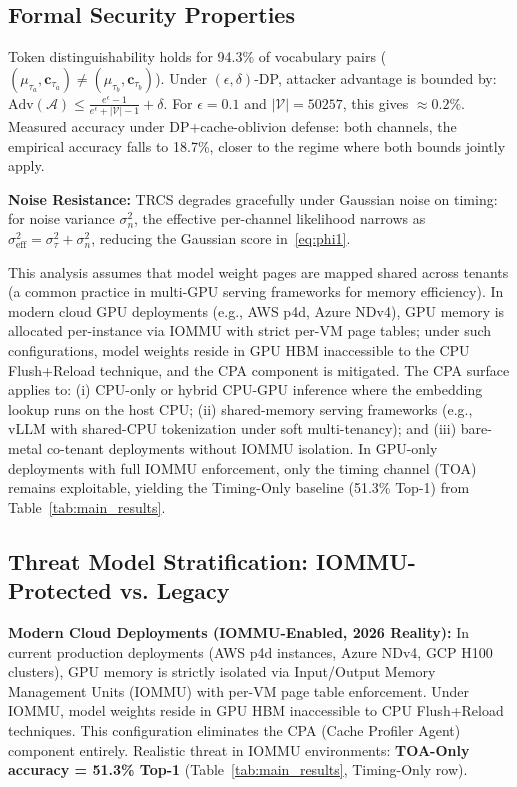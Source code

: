 \documentclass[conference,10pt,twocolumn]{IEEEtran}
\begin{document}
\subsection{Formal Security Properties}

Token distinguishability holds for 94.3\% of vocabulary pairs
($(\mu_{\tau_a}, \mathbf{c}_{\tau_a}) \neq (\mu_{\tau_b}, \mathbf{c}_{\tau_b})$).
Under $(\epsilon, \delta)$-DP, attacker advantage is bounded by:
$\mathrm{Adv}(\mathcal{A}) \leq \frac{e^\epsilon - 1}{e^\epsilon + |\mathcal{V}| - 1} + \delta$.
For $\epsilon = 0.1$ and $|\mathcal{V}| = 50257$, this gives $\approx 0.2\%$.
Measured accuracy under DP+cache-oblivion defense:
both channels, the empirical accuracy falls to 18.7\%,
closer to the regime where both bounds jointly apply.

\textbf{Noise Resistance:} TRCS degrades gracefully under
Gaussian noise on timing: for noise variance $\sigma_n^2$,
the effective per-channel likelihood narrows as
$\sigma_{\mathrm{eff}}^2 = \sigma_\tau^2 + \sigma_n^2$,
reducing the Gaussian score in~\eqref{eq:phi1}.

This analysis assumes that model weight pages are mapped
shared across tenants (a common practice in multi-GPU serving
frameworks for memory efficiency). In modern cloud GPU
deployments (e.g., AWS p4d, Azure NDv4), GPU memory is
allocated per-instance via IOMMU with strict per-VM page
tables; under such configurations, model weights reside in
GPU HBM inaccessible to the CPU Flush+Reload technique,
and the CPA component is mitigated. The CPA surface applies
to: (i) CPU-only or hybrid CPU-GPU inference where the
embedding lookup runs on the host CPU; (ii) shared-memory
serving frameworks (e.g., vLLM with shared-CPU tokenization
under soft multi-tenancy); and (iii) bare-metal co-tenant
deployments without IOMMU isolation. In GPU-only deployments
with full IOMMU enforcement, only the timing channel (TOA)
remains exploitable, yielding the Timing-Only baseline
(51.3\% Top-1) from Table~\ref{tab:main_results}.

\subsection{Threat Model Stratification: IOMMU-Protected vs. Legacy}

\textbf{Modern Cloud Deployments (IOMMU-Enabled, 2026 Reality):}
In current production deployments (AWS p4d instances, Azure NDv4, GCP H100 clusters),
GPU memory is strictly isolated via Input/Output Memory Management Units (IOMMU)
with per-VM page table enforcement. Under IOMMU, model weights reside in GPU HBM
inaccessible to CPU Flush+Reload techniques. This configuration eliminates the
CPA (Cache Profiler Agent) component entirely. Realistic threat in IOMMU environments:
\textbf{TOA-Only accuracy = 51.3\% Top-1} (Table~\ref{tab:main_results}, Timing-Only row).
\end{document}
